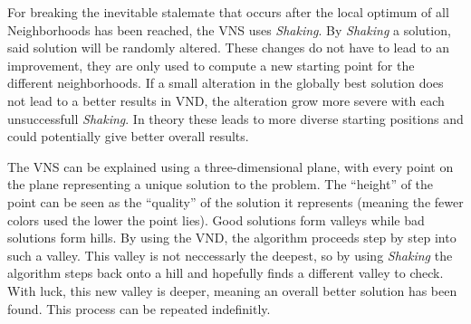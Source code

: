 \documentclass[paper=a4,fontsize=12pt]{scrartcl}
\begin{document}
{For breaking the inevitable stalemate that occurs after the local optimum of all Neighborhoods has been reached, the VNS uses \emph{Shaking}. By \emph{Shaking} a solution, said solution will be randomly altered. These changes do not have to lead to an improvement, they are only used to compute a new starting point for the different neighborhoods. If a small alteration in the globally best solution does not lead to a better results in VND, the alteration grow more severe with each unsuccessfull \emph{Shaking}. In theory these leads to more diverse starting positions and could potentially give better overall results.


The VNS can be explained using a three-dimensional plane, with every point on the plane representing a unique solution to the problem. The ``height'' of the point can be seen as the ``quality'' of the solution it represents (meaning the fewer colors used the lower the point lies). Good solutions form valleys while bad solutions form hills. By using the VND, the algorithm proceeds step by step into such a valley. This valley is not neccessarly the deepest, so by using \emph{Shaking} the algorithm steps back onto a hill and hopefully finds a different valley to check. With luck, this new valley is deeper, meaning an overall better solution has been found. This process can be repeated indefinitly.



}
\end{document}
